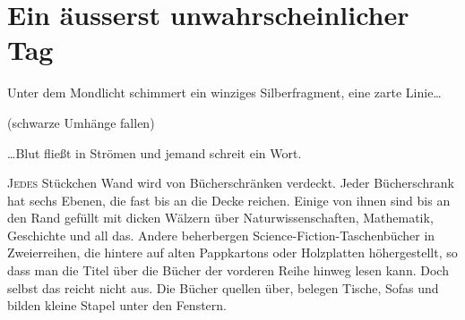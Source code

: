 \chapter[Ein äußerst unwahrscheinlicher Tag]{Ein äusserst unwahrscheinlicher Tag}

\begin{chapterOpeningQuote}
\noindent
Unter dem Mondlicht schimmert ein winziges Silberfragment, eine zarte Linie…

\vspace*{2ex}
(schwarze Umhänge fallen)

\vspace*{2ex}
…Blut fließt in Strömen und jemand schreit ein Wort.
\end{chapterOpeningQuote}

\lettrine{J}{edes} Stückchen Wand wird von Bücherschränken verdeckt. Jeder Bücherschrank hat sechs Ebenen, die fast bis an die Decke reichen. Einige von ihnen sind bis an den Rand gefüllt mit dicken Wälzern über Naturwissenschaften, Mathematik, Geschichte und all das. Andere beherbergen Science-Fiction-Taschenbücher in Zweierreihen, die hintere auf alten Pappkartons oder Holzplatten höhergestellt, so dass man die Titel über die Bücher der vorderen Reihe hinweg lesen kann. Doch selbst das reicht nicht aus. Die Bücher quellen über, belegen Tische, Sofas und bilden kleine Stapel unter den Fenstern.

